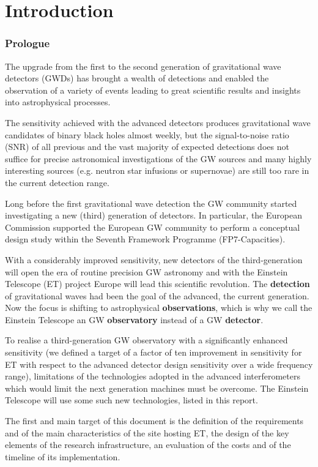 \chapter{Introduction}
\label{chap:Intro}

\subsection[Prologue]{Prologue}
\label{Prologue}
The upgrade from the first to the second generation of gravitational wave detectors (GWDs) has brought a wealth of detections and enabled the observation of a variety of events leading to great scientific results and insights into astrophysical processes. 

The sensitivity achieved with the advanced detectors produces gravitational wave candidates of binary black holes almost weekly, but the signal-to-noise ratio (SNR) of all previous and the vast majority of expected detections does not suffice for precise astronomical investigations of the GW sources and many highly interesting sources (e.g. neutron star infusions or supernovae) are still too rare in the current detection range. \par    
Long before the first gravitational wave detection the GW community started investigating a new (third) generation of detectors. In particular, the European Commission supported the European GW community to perform a conceptual design study within the Seventh Framework Programme (FP7-Capacities).\par 
With a considerably improved sensitivity, new detectors of the third-generation will open the era of routine precision GW astronomy and with the Einstein Telescope (ET) project Europe will lead this scientific revolution. The \textbf{detection} of gravitational waves had been the goal of the advanced, the current generation. Now the focus is shifting to astrophysical \textbf{observations}, which is why we call the Einstein Telescope an GW \textbf{observatory} instead of a GW \textbf{detector}.\par
To realise a third-generation GW observatory with a significantly enhanced sensitivity (we defined a target of a factor of ten improvement in sensitivity for ET with respect to the advanced detector design sensitivity over a wide frequency range), limitations of the technologies adopted in the advanced interferometers which would limit the next generation machines must be overcome. The Einstein Telescope will use some such new technologies, listed in this report.\par
The first and main target of this document is the definition of  the requirements and of the main characteristics of the site hosting ET, the design of the key elements of the research infrastructure, an evaluation of the costs and of the timeline of its implementation.

